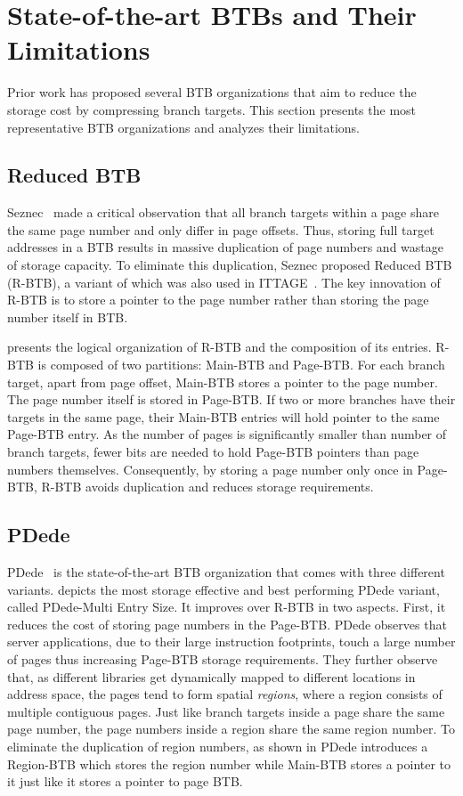 \section{State-of-the-art BTBs and Their Limitations}
\label{hpca:sec:btbOrgs}

Prior work has proposed several BTB organizations that aim to reduce the storage cost by compressing branch targets. This section presents the most representative BTB organizations and analyzes their limitations.

\subsection{Reduced BTB} Seznec~\cite{DUPN} made a critical observation that all branch targets within a page share the same page number and only differ in page offsets. Thus, storing full target addresses in a BTB results in massive duplication of page numbers and wastage of storage capacity. To eliminate this duplication, Seznec proposed Reduced BTB (R-BTB), a variant of which was also used in ITTAGE~\cite{ittage}. The key innovation of R-BTB is to store a pointer to the page number rather than storing the page number itself in BTB. 

 presents the logical organization of R-BTB and the composition of its entries. R-BTB is composed of two partitions: Main-BTB and Page-BTB. For each branch target, apart from page offset, Main-BTB stores a pointer to the page number. The page number itself is stored in Page-BTB. If two or more branches have their targets in the same page, their Main-BTB entries will hold pointer to the same Page-BTB entry. As the number of pages is significantly smaller than number of branch targets, fewer bits are needed to hold Page-BTB pointers than page numbers themselves. Consequently, by storing a page number only once in Page-BTB, R-BTB avoids duplication and reduces storage requirements. 

\subsection{PDede}
\label{hpca:sec:pdedearch}
PDede~\cite{pdede} is the state-of-the-art BTB organization that comes with three different variants.  depicts the most storage effective and best performing PDede variant, called PDede-Multi Entry Size. It improves over R-BTB in two aspects. First, it reduces the cost of storing page numbers in the Page-BTB. PDede observes that server applications, due to their large instruction footprints, touch a large number of pages thus increasing Page-BTB storage requirements. They further observe that, as different libraries get dynamically mapped to different locations in address space,  the pages tend to form spatial \emph{regions}, where a region consists of multiple contiguous pages. Just like branch targets inside a page share the same page number, the page numbers inside a region share the same region number. To eliminate the duplication of region numbers, as shown in  PDede introduces a Region-BTB which stores the region number while Main-BTB stores a pointer to it just like it stores a pointer to page BTB. 

